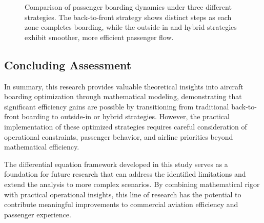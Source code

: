 \begin{figure}[h]
\centering
{}
\caption{Comparison of passenger boarding dynamics under three different strategies. The back-to-front strategy shows distinct steps as each zone completes boarding, while the outside-in and hybrid strategies exhibit smoother, more efficient passenger flow.}
\label{fig:strategy_comparison}
\end{figure}

\subsection{Concluding Assessment}

In summary, this research provides valuable theoretical insights into aircraft boarding optimization through mathematical modeling, demonstrating that significant efficiency gains are possible by transitioning from traditional back-to-front boarding to outside-in or hybrid strategies. However, the practical implementation of these optimized strategies requires careful consideration of operational constraints, passenger behavior, and airline priorities beyond mathematical efficiency.

The differential equation framework developed in this study serves as a foundation for future research that can address the identified limitations and extend the analysis to more complex scenarios. By combining mathematical rigor with practical operational insights, this line of research has the potential to contribute meaningful improvements to commercial aviation efficiency and passenger experience.